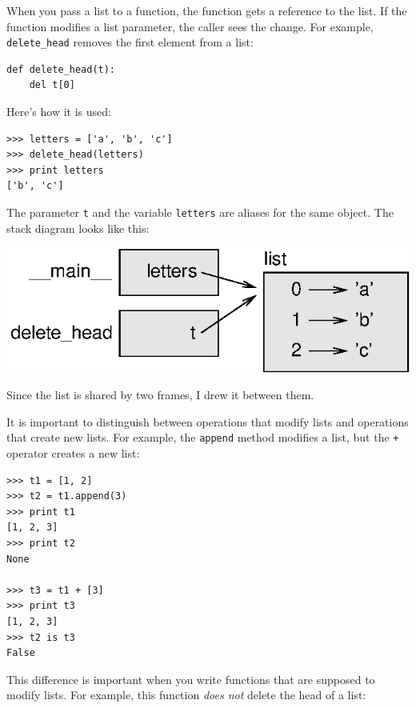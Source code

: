 \documentclass[10pt]{book}
\begin{document}

When you pass a list to a function, the function gets a reference
to the list.
If the function modifies a list parameter, the caller sees the change.
For example, \verb"delete_head" removes the first element from a list:

\beforeverb
\begin{verbatim}
def delete_head(t):
    del t[0]
\end{verbatim}
\afterverb
%
Here's how it is used:

\beforeverb
\begin{verbatim}
>>> letters = ['a', 'b', 'c']
>>> delete_head(letters)
>>> print letters
['b', 'c']
\end{verbatim}
\afterverb
%
The parameter {\tt t} and the variable {\tt letters} are
aliases for the same object.  The stack diagram looks like
this:


\beforefig
\centerline{\includegraphics{figs/stack5.eps}}
\afterfig

Since the list is shared by two frames, I drew
it between them.

It is important to distinguish between operations that
modify lists and operations that create new lists.  For
example, the {\tt append} method modifies a list, but the
{\tt +} operator creates a new list:


\beforeverb
\begin{verbatim}
>>> t1 = [1, 2]
>>> t2 = t1.append(3)
>>> print t1
[1, 2, 3]
>>> print t2
None

>>> t3 = t1 + [3]
>>> print t3
[1, 2, 3]
>>> t2 is t3
False
\end{verbatim}
\afterverb

This difference is important when you write functions that
are supposed to modify lists.  For example, this function
\emph{does not} delete the head of a list:
\end{document}
